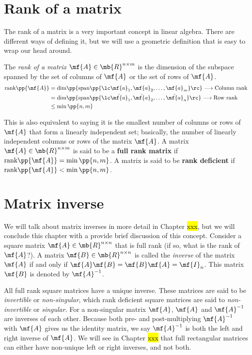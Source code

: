 \section{Rank of a matrix}
The rank of a matrix is a very important concept in linear algebra. There are different ways of defining it, but we will use a geometric definition that is easy to wrap our head around.  

The \textit{rank of a matrix} $\mf{A} \in \mb{R}^{n \times m}$ is the dimension of the subspace spanned by the set of columns of $\mf{A}$ or the set of rows of $\mf{A}$.
\begin{equation}
    \begin{split}
    \text{rank}\pp{\mf{A}} &= \text{dim}\pp{\text{span}\pp{\lc \mf{a}_1, \mf{a}_2, \ldots, \mf {a}_m} \rc} \longrightarrow \text{Column rank}\\ 
    &= \text{dim}\pp{\text{span}\pp{\lc \tilde{\mf{a}}_1, \tilde{\mf{a}}_2, \ldots, \tilde{\mf{a}}_n} \rc} \longrightarrow \text{Row rank} \\
    &\leq \min\pp{n, m}
    \end{split}
    \label{eq:ch02-mat-rank}
\end{equation}

This is also equivalent to saying it is the smallest number of columns or rows of $\mf{A}$ that form  a linearly independent set; basically, the number of linearly independent columns or rows of the matrix $\mf{A}$. A matrix $\mf{A} \in \mb{R}^{n \times m}$ is said to be a \textbf{full rank matrix} if $\text{rank}\pp{\mf{A}} = \min\pp{n, m}$. A matrix is said to be \textbf{rank deficient} if $\text{rank}\pp{\mf{A}} < \min\pp{n, m}$.

\section{Matrix inverse}
We will talk about matrix inverses in more detail in Chapter \hl{xxx}, but we will conclude this chapter with a provide brief discussion of this concept. Consider a square matrix $\mf{A} \in \mb{R}^{n \times n}$ that is full rank (if so, what is the rank of $\mf{A}$?). A matrix $\mf{B} \in \mb{R}^{n \times n}$ is called the \textit{inverse} of the matrix $\mf{A}$ if and only if $\mf{A}\mf{B} = \mf{B}\mf{A} = \mf{I}_n$. This matrix $\mf{B}$ is denoted by $\mf{A}^{-1}$. 

All full rank square matrices have a unique inverse. These matrices are said to be \textit{invertible} or \textit{non-singular}, which rank deficient square matrices are said to \textit{non-invertible} or \textit{singular}. For a non-singular matrix $\mf{A}$, $\mf{A}$ and $\mf{A}^{-1}$ are inverses of each other. Because both pre- and post-multiplying $\mf{A}^{-1}$ with $\mf{A}$ gives us the identity matrix, we say $\mf{A}^{-1}$ is both the left and right inverse of $\mf{A}$. We will see in Chapter \hl{xxx} that full rectangular matrices can either have non-unique left or right inverses, and not both.

